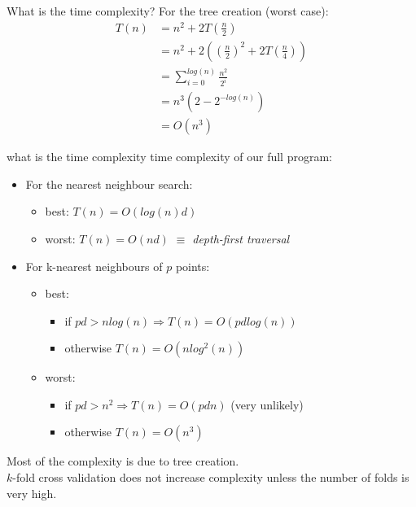 \documentclass[11 pt]{beamer}
\begin{document}
\begin{frame}{What is the time complexity?}
  For the tree creation (worst case):
  \begin{align*}
    T(n) &= n^2 +2T\left(\frac{n}{2}\right)\\
         &= n^2 +2\left(\left(\frac{n}{2}\right)^2+2T\left(\frac{n}{4}\right)\right)\\
         &= \sum^{log(n)}_{i=0}\frac{n^2}{2^i}\\
         &= n^3(2-2^{-log(n)})\\
         &= O(n^3)
  \end{align*}
\end{frame}
%
\begin{frame}{what is the time complexity}
  time complexity of our full program:
  \smallskip
  \begin{itemize}
  \item For the nearest neighbour search:
  \begin{itemize}
    \item best: $T(n)=O(log(n)d)$
    \item worst: $T(n)=O(nd)$ \emph{$\equiv$ depth-first traversal}
  \end{itemize}
  \item For k-nearest neighbours of $p$ points:
  \begin{itemize}
    \item best:
    \begin{itemize}
      \item if $pd>nlog(n) \Rightarrow T(n) = O(pdlog(n))$
      \item otherwise $T(n) = O(nlog^2(n))$
    \end{itemize}
    \item worst:
    \begin{itemize}
      \item if $pd>n^2 \Rightarrow T(n)=O(pdn)$ (very unlikely)
      \item otherwise $T(n)=O(n^3)$
    \end{itemize}
  \end{itemize}
\end{itemize}
\smallskip
Most of the complexity is due to tree creation.\\\smallskip
$k$-fold cross validation does not increase complexity unless the number of folds is very high.
\end{frame}
%
\end{document}
